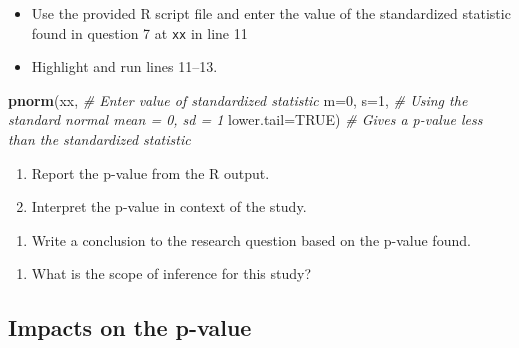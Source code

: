 \documentclass[
]{report}
\newenvironment{Shaded}{\begin{snugshade}}{\end{snugshade}}
\newcommand{\AttributeTok}[1]{\textcolor[rgb]{0.13,0.29,0.53}{#1}}
\newcommand{\CommentTok}[1]{\textcolor[rgb]{0.56,0.35,0.01}{\textit{#1}}}
\newcommand{\ConstantTok}[1]{\textcolor[rgb]{0.56,0.35,0.01}{#1}}
\newcommand{\DecValTok}[1]{\textcolor[rgb]{0.00,0.00,0.81}{#1}}
\newcommand{\FunctionTok}[1]{\textcolor[rgb]{0.13,0.29,0.53}{\textbf{#1}}}
\newcommand{\NormalTok}[1]{#1}
\providecommand{\tightlist}{%
  \setlength{\itemsep}{0pt}\setlength{\parskip}{0pt}}
\begin{document}
\begin{itemize}
\item
  Use the provided R script file and enter the value of the standardized statistic found in question 7 at \texttt{xx} in line 11
\item
  Highlight and run lines 11--13.
\end{itemize}

\begin{Shaded}
\begin{Highlighting}[]
\FunctionTok{pnorm}\NormalTok{(xx, }\CommentTok{\# Enter value of standardized statistic}
      \AttributeTok{m=}\DecValTok{0}\NormalTok{, }\AttributeTok{s=}\DecValTok{1}\NormalTok{, }\CommentTok{\# Using the standard normal mean = 0, sd = 1}
      \AttributeTok{lower.tail=}\ConstantTok{TRUE}\NormalTok{) }\CommentTok{\# Gives a p{-}value less than the standardized statistic}
\end{Highlighting}
\end{Shaded}

\begin{enumerate}
\def\labelenumi{\arabic{enumi}.}
\setcounter{enumi}{8}
\item
  Report the p-value from the R output.
  \vspace{0.2in}
\item
  Interpret the p-value in context of the study.
\end{enumerate}

\vspace{1in}

\begin{enumerate}
\def\labelenumi{\arabic{enumi}.}
\setcounter{enumi}{10}
\tightlist
\item
  Write a conclusion to the research question based on the p-value found.
\end{enumerate}

\vspace{0.8in}

\begin{enumerate}
\def\labelenumi{\arabic{enumi}.}
\setcounter{enumi}{11}
\tightlist
\item
  What is the scope of inference for this study?
\end{enumerate}

\vspace{0.8in}

\hypertarget{impacts-on-the-p-value}{%
\subsection*{Impacts on the p-value}\label{impacts-on-the-p-value}}
\end{document}
